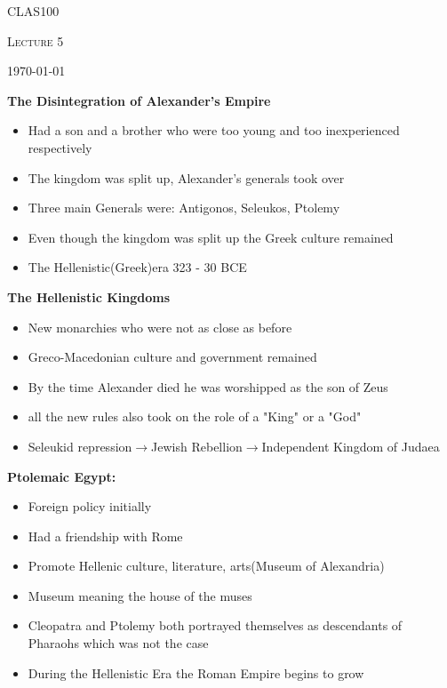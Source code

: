 \documentclass[12pt,a4paper]{report}
\begin{document}
	\centering
	{\scshape\LARGE CLAS100 \par}
	{\scshape\Large Lecture 5\par}
	{\large \today\par}
	\vspace{1.5cm}

	\textbf{The Disintegration of Alexander's Empire}
	\begin{itemize}
	\item Had a son and a brother who were too young and too inexperienced respectively 
	\item The kingdom was split up, Alexander's generals took over
	\item Three main Generals were: Antigonos, Seleukos, Ptolemy
	\item Even though the kingdom was split up the Greek culture remained
	\item The Hellenistic(Greek)era 323 - 30 BCE
	\end{itemize}
	\textbf{The Hellenistic Kingdoms}
	\begin{itemize}
	\item New monarchies who were not as close as before
	\item Greco-Macedonian culture and government remained
	\item By the time Alexander died he was worshipped as the son of Zeus
	\item all the new rules also took on the role of a "King" or a "God"
	\item Seleukid repression$\rightarrow$Jewish Rebellion$\rightarrow$Independent Kingdom of Judaea
	\end{itemize}
	\textbf{Ptolemaic Egypt:}
	\begin{itemize}
	\item Foreign policy initially
	\item Had a friendship with Rome
	\item Promote Hellenic culture, literature, arts(Museum of Alexandria)
	\item Museum meaning the house of the muses
	\item Cleopatra and Ptolemy both portrayed themselves as descendants of Pharaohs which was not the case
	\item During the Hellenistic Era the Roman Empire begins to grow
	\end{itemize}
\end{document}
